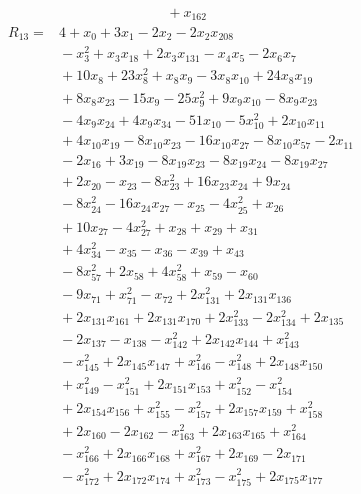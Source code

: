 {\begin{align*}
&{}  + x_{162}
\end{align*}
\begin{align*}
R_{13} ={}& 4 + x_{0} + 3x_{1} - 2x_{2} - 2x_{2} x_{208} \\
&{}  - x_{3}^{2} + x_{3} x_{18} + 2x_{3} x_{131} - x_{4} x_{5} - 2x_{6} x_{7} \\
&{}  + 10x_{8} + 23x_{8}^{2} + x_{8} x_{9} - 3x_{8} x_{10} + 24x_{8} x_{19} \\
&{}  + 8x_{8} x_{23} - 15x_{9} - 25x_{9}^{2} + 9x_{9} x_{10} - 8x_{9} x_{23} \\
&{}  - 4x_{9} x_{24} + 4x_{9} x_{34} - 51x_{10} - 5x_{10}^{2} + 2x_{10} x_{11} \\
&{}  + 4x_{10} x_{19} - 8x_{10} x_{23} - 16x_{10} x_{27} - 8x_{10} x_{57} - 2x_{11} \\
&{}  - 2x_{16} + 3x_{19} - 8x_{19} x_{23} - 8x_{19} x_{24} - 8x_{19} x_{27} \\
&{}  + 2x_{20} - x_{23} - 8x_{23}^{2} + 16x_{23} x_{24} + 9x_{24} \\
&{}  - 8x_{24}^{2} - 16x_{24} x_{27} - x_{25} - 4x_{25}^{2} + x_{26} \\
&{}  + 10x_{27} - 4x_{27}^{2} + x_{28} + x_{29} + x_{31} \\
&{}  + 4x_{34}^{2} - x_{35} - x_{36} - x_{39} + x_{43} \\
&{}  - 8x_{57}^{2} + 2x_{58} + 4x_{58}^{2} + x_{59} - x_{60} \\
&{}  - 9x_{71} + x_{71}^{2} - x_{72} + 2x_{131}^{2} + 2x_{131} x_{136} \\
&{}  + 2x_{131} x_{161} + 2x_{131} x_{170} + 2x_{133}^{2} - 2x_{134}^{2} + 2x_{135} \\
&{}  - 2x_{137} - x_{138} - x_{142}^{2} + 2x_{142} x_{144} + x_{143}^{2} \\
&{}  - x_{145}^{2} + 2x_{145} x_{147} + x_{146}^{2} - x_{148}^{2} + 2x_{148} x_{150} \\
&{}  + x_{149}^{2} - x_{151}^{2} + 2x_{151} x_{153} + x_{152}^{2} - x_{154}^{2} \\
&{}  + 2x_{154} x_{156} + x_{155}^{2} - x_{157}^{2} + 2x_{157} x_{159} + x_{158}^{2} \\
&{}  + 2x_{160} - 2x_{162} - x_{163}^{2} + 2x_{163} x_{165} + x_{164}^{2} \\
&{}  - x_{166}^{2} + 2x_{166} x_{168} + x_{167}^{2} + 2x_{169} - 2x_{171} \\
&{}  - x_{172}^{2} + 2x_{172} x_{174} + x_{173}^{2} - x_{175}^{2} + 2x_{175} x_{177} \\

\end{align*}}
